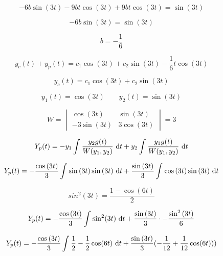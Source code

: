 \documentclass{scrartcl}
\DeclareRobustCommand*\d
{\ifmmode\mathop{}\!\mathrm{d}\else\expandafter\originald\fi}
\begin{document}
	\[-6b\sin{(3t)}-9bt\cos{(3t)} + 9b t\cos{(3t)}=\sin{(3t)}\]
	
	\[-6b\sin{(3t)}=\sin{(3t)}\]
	
	\[b = -\frac{1}{6}\]
	
	\[y_c(t) + y_p(t) =c_1 \cos{(3t)} + c_2 \sin{(3t)} - \frac{1}{6} t\cos{(3t)}\]
	
	
	\[y_c(t)=c_1 \cos{(3t)} + c_2 \sin{(3t)}\]
	
	\[y_1(t)= \cos{(3t)} \qquad y_2(t)= \sin{(3t)}\]
	
	\[W = \begin{vmatrix}
		\cos{(3t)} & \sin{(3t)}\\
		-3\sin{(3t)} & 3\cos{(3t)}	
	\end{vmatrix}=3\]
	
	\[Y_p(t)=-y_1 \int_{}^{} \frac{y_2 g(t)}{W(y_1,y_2)} \,\d t+ y_2 \int_{}^{} \frac{y_1 g(t)}{W(y_1,y_2)} \, \d t\]
	
	\[Y_p(t)=-\frac{\cos{(3t)}}{3} \int_{}^{}\sin{(3t)\sin{(3t)}} \, \d t+ \frac{\sin{(3t)}}{3} \int_{}^{}\cos{(3t)\sin{(3t)}} \, \d t\]
	
	\[sin^2{(3t)}= \frac{1-\cos{(6t)}}{2}\]
	
	\[Y_p(t)=-\frac{\cos{(3t)}}{3} \int_{}^{}\sin^2(3t) \, \d t+ \frac{\sin{(3t)}}{3} \cdot - \frac{\sin^2{(3t)}}{6} \]
	
	\[Y_p(t)=-\frac{\cos{(3t)}}{3} \int_{}^{}\frac{1}{2}-\frac{1}{2}\cos(6t) \, \d t+ \frac{\sin{(3t)}}{3} (-\frac{1}{12}+\frac{1}{12}\cos(6t))) \]
	
	
	
	
\end{document}
